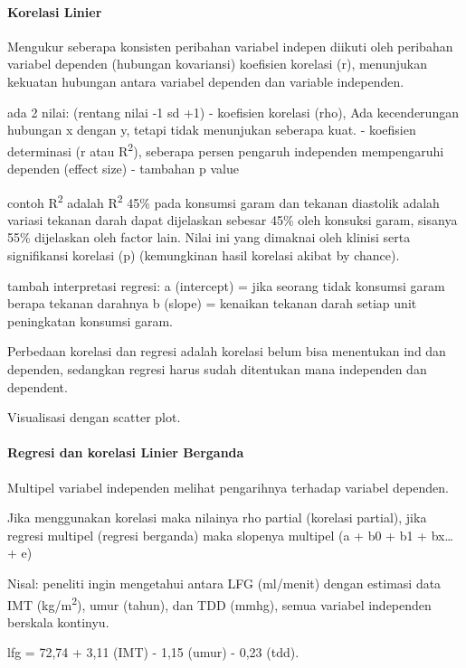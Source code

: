 \documentclass[
  letterpaper,
  DIV=11,
  numbers=noendperiod]{scrreprt}
\let\oldparagraph\paragraph
\renewcommand{\paragraph}[1]{\oldparagraph{#1}\mbox{}}
\begin{document}
\paragraph{Korelasi Linier}\label{korelasi-linier}

Mengukur seberapa konsisten peribahan variabel indepen diikuti oleh
peribahan variabel dependen (hubungan kovariansi) koefisien korelasi
(r), menunjukan kekuatan hubungan antara variabel dependen dan variable
independen.

ada 2 nilai: (rentang nilai -1 sd +1) - koefisien korelasi (rho), Ada
kecenderungan hubungan x dengan y, tetapi tidak menunjukan seberapa
kuat. - koefisien determinasi (r atau R\textsuperscript{2}), seberapa
persen pengaruh independen mempengaruhi dependen (effect size) -
tambahan p value

contoh R\textsuperscript{2} adalah R\textsuperscript{2} 45\% pada
konsumsi garam dan tekanan diastolik adalah variasi tekanan darah dapat
dijelaskan sebesar 45\% oleh konsuksi garam, sisanya 55\% dijelaskan
oleh factor lain. Nilai ini yang dimaknai oleh klinisi serta
signifikansi korelasi (p) (kemungkinan hasil korelasi akibat by chance).

tambah interpretasi regresi: a (intercept) = jika seorang tidak konsumsi
garam berapa tekanan darahnya b (slope) = kenaikan tekanan darah setiap
unit peningkatan konsumsi garam.

Perbedaan korelasi dan regresi adalah korelasi belum bisa menentukan ind
dan dependen, sedangkan regresi harus sudah ditentukan mana independen
dan dependent.

Visualisasi dengan scatter plot.

\paragraph{Regresi dan korelasi Linier
Berganda}\label{regresi-dan-korelasi-linier-berganda}

Multipel variabel independen melihat pengarihnya terhadap variabel
dependen.

Jika menggunakan korelasi maka nilainya rho partial (korelasi partial),
jika regresi multipel (regresi berganda) maka slopenya multipel (a + b0
+ b1 + bx\ldots{} + e)

Nisal: peneliti ingin mengetahui antara LFG (ml/menit) dengan estimasi
data IMT (kg/m\textsuperscript{2}), umur (tahun), dan TDD (mmhg), semua
variabel independen berskala kontinyu.

lfg = 72,74 + 3,11 (IMT) - 1,15 (umur) - 0,23 (tdd).
\end{document}
